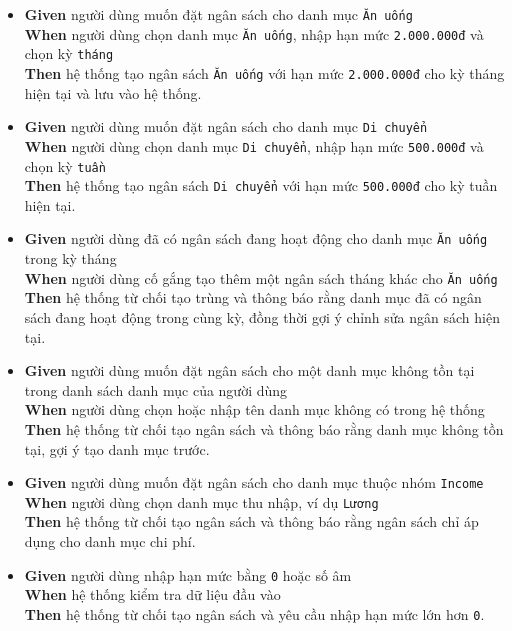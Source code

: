 \begin{itemize}
\item \textbf{Given} người dùng muốn đặt ngân sách cho danh mục \texttt{Ăn uống}  \\ \hspace*{1.5em}  \textbf{When} người dùng chọn danh mục \texttt{Ăn uống}, nhập hạn mức \texttt{2.000.000đ} và chọn kỳ \texttt{tháng}  \\ \hspace*{1.5em}  \textbf{Then} hệ thống tạo ngân sách \texttt{Ăn uống} với hạn mức \texttt{2.000.000đ} cho kỳ tháng hiện tại và lưu vào hệ thống.
\item \textbf{Given} người dùng muốn đặt ngân sách cho danh mục \texttt{Di chuyển}  \\ \hspace*{1.5em}  \textbf{When} người dùng chọn danh mục \texttt{Di chuyển}, nhập hạn mức \texttt{500.000đ} và chọn kỳ \texttt{tuần}  \\ \hspace*{1.5em}  \textbf{Then} hệ thống tạo ngân sách \texttt{Di chuyển} với hạn mức \texttt{500.000đ} cho kỳ tuần hiện tại.
\item \textbf{Given} người dùng đã có ngân sách đang hoạt động cho danh mục \texttt{Ăn uống} trong kỳ tháng  \\ \hspace*{1.5em}  \textbf{When} người dùng cố gắng tạo thêm một ngân sách tháng khác cho \texttt{Ăn uống}  \\ \hspace*{1.5em}  \textbf{Then} hệ thống từ chối tạo trùng và thông báo rằng danh mục đã có ngân sách đang hoạt động trong cùng kỳ, đồng thời gợi ý chỉnh sửa ngân sách hiện tại.
\item \textbf{Given} người dùng muốn đặt ngân sách cho một danh mục không tồn tại trong danh sách danh mục của người dùng  \\ \hspace*{1.5em}  \textbf{When} người dùng chọn hoặc nhập tên danh mục không có trong hệ thống  \\ \hspace*{1.5em}  \textbf{Then} hệ thống từ chối tạo ngân sách và thông báo rằng danh mục không tồn tại, gợi ý tạo danh mục trước.
\item \textbf{Given} người dùng muốn đặt ngân sách cho danh mục thuộc nhóm \texttt{Income}  \\ \hspace*{1.5em}  \textbf{When} người dùng chọn danh mục thu nhập, ví dụ \texttt{Lương}  \\ \hspace*{1.5em}  \textbf{Then} hệ thống từ chối tạo ngân sách và thông báo rằng ngân sách chỉ áp dụng cho danh mục chi phí.
\item \textbf{Given} người dùng nhập hạn mức bằng \texttt{0} hoặc số âm  \\ \hspace*{1.5em}  \textbf{When} hệ thống kiểm tra dữ liệu đầu vào  \\ \hspace*{1.5em}  \textbf{Then} hệ thống từ chối tạo ngân sách và yêu cầu nhập hạn mức lớn hơn \texttt{0}.
\end{itemize}
